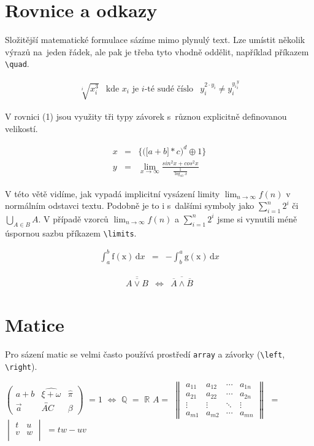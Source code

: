 \documentclass[a4paper, 11pt]{article}
\theoremstyle{definition}
\begin{document}
\begin{twocolumn}
\section{Rovnice a odkazy}

Složitější matematické formulace sázíme mimo plynulý text. Lze umístit několik výrazů na~jeden řádek, ale pak je třeba tyto vhodně oddělit, například příkazem \verb|\quad|.

\begin{eqnarray*}
\sqrt[i]{x_i^3} & \textrm{kde $x_i$ je $i$-té sudé číslo} & y_i^{2\cdot {y_i}} \neq y_i^{{y_i}^y_{i}}
\end{eqnarray*}

V rovnici (1) jsou využity tři typy závorek s~různou explicitně definovanou velikostí.

\begin{eqnarray}
x & = & \Bigg\{ \bigg( \Big[a + b \Big] \ast c \bigg )^d \oplus 1 \Bigg\}\\
y & = & \lim_{x \to \infty}\frac{sin^{2}x + cos^{2}x}{\frac{1}{\log_{10}x}} \nonumber
\end{eqnarray}

V této větě vidíme, jak vypadá implicitní  vysázení limity $\lim_{n \to \infty}f(n)$ v normálním odstavci textu. Podobně je to i s~dalšími symboly jako $\sum\limits _{i=1}^n 2^i$ či $\bigcup_{A\in B}A$. V případě vzorců $\lim_{n \to \infty}f(n)$ a $\sum\limits _{i=1}^n 2^i$ jsme si vynutili méně úspornou sazbu příkazem \verb|\limits|.

\begin{eqnarray}
\int_a^b \mathrm{f(x)}\,\mathrm{d}x & = & -\int_b^a \mathrm{g(x)}\,\mathrm{d}x
\end{eqnarray}

\begin{eqnarray}
\overline{\overline{A \vee B}} & \Leftrightarrow & \overline{\overline{A} \wedge \overline {B}}
\end{eqnarray}

\section{Matice}
Pro sázení matic se velmi často používá prostředí \verb|array| a závorky (\verb|\left|, \verb|\right|).

$
\begin{pmatrix} 
a + b & \widehat{\xi + \omega} & \widehat{\pi} \\
\overrightarrow{a} & \overleftrightarrow{AC} & \beta
\end{pmatrix}
$
$
= 1
$
$
\iff
$
$
\mathbb{Q}
$
$
=
$
$
\mathbb{R}
$
$ A = $
$
\begin{Vmatrix}
  a_{11} & a_{12} & \cdots & a_{1n} \\
  a_{21} & a_{22} & \cdots & a_{2n} \\
  \vdots  & \vdots  & \ddots & \vdots  \\
  a_{m1} & a_{m2} & \cdots & a_{mn}
\end{Vmatrix}
$
$ = $
$
\begin{vmatrix} 
t & u \\
v & w \\
\end{vmatrix}
$
$ = tw - uv $


\end{twocolumn}
\end{document}
